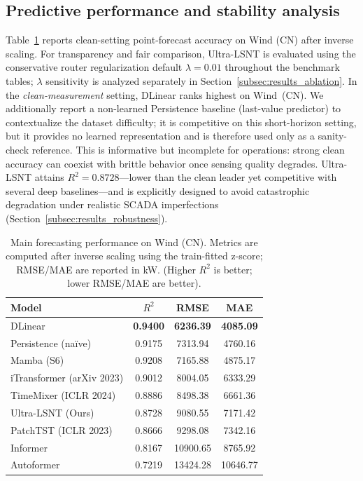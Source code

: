 \documentclass[review,3p,times]{elsarticle}
\begin{document}
\subsection{Predictive performance and stability analysis}
\label{subsec:results_main}
Table~\ref{tab:main_wind_cn} reports clean-setting point-forecast accuracy on Wind (CN) after inverse scaling. For transparency and fair comparison, Ultra-LSNT is evaluated using the conservative router regularization default $\lambda=0.01$ throughout the benchmark tables; $\lambda$ sensitivity is analyzed separately in Section~\ref{subsec:results_ablation}. In the \emph{clean-measurement} setting, DLinear ranks highest on Wind~(CN). We additionally report a non-learned Persistence baseline (last-value predictor) to contextualize the dataset difficulty; it is competitive on this short-horizon setting, but it provides no learned representation and is therefore used only as a sanity-check reference.
 This is informative but incomplete for operations: strong clean accuracy can coexist with brittle behavior once sensing quality degrades. Ultra-LSNT attains $R^2=0.8728$---lower than the clean leader yet competitive with several deep baselines---and is explicitly designed to avoid catastrophic degradation under realistic SCADA imperfections (Section~\ref{subsec:results_robustness}).

\begin{table}[t]
\centering
\caption{Main forecasting performance on Wind (CN). Metrics are computed after inverse scaling using the train-fitted z-score; RMSE/MAE are reported in kW. (Higher $R^2$ is better; lower RMSE/MAE are better).}
\label{tab:main_wind_cn}
\begin{tabular}{lccc}
\toprule
Model & $R^2$ & RMSE & MAE \\
\midrule
DLinear & \textbf{0.9400} & \textbf{6236.39} & \textbf{4085.09} \\
Persistence (na\"ive) & 0.9175 & 7313.94 & 4760.16 \\
Mamba (S6) & 0.9208 & 7165.88 & 4875.17 \\
iTransformer (arXiv 2023) & 0.9012 & 8004.05 & 6333.29 \\
TimeMixer (ICLR 2024) & 0.8886 & 8498.38 & 6661.36 \\
Ultra-LSNT (Ours) & 0.8728 & 9080.55 & 7171.42 \\
PatchTST (ICLR 2023) & 0.8666 & 9298.08 & 7342.16 \\
Informer & 0.8167 & 10900.65 & 8765.92 \\
Autoformer & 0.7219 & 13424.28 & 10646.77 \\
\bottomrule
\end{tabular}
\end{table}
\end{document}
